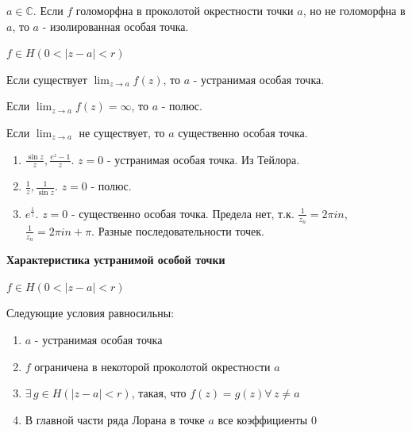 \begin{definition}
    $a \in \mathbb{C}$. Если $f$ голоморфна в проколотой окрестности
    точки $a$, но не голоморфна в $a$, то $a$ - изолированная особая точка.

    $f \in H(0 < |z - a| < r)$
\end{definition}

\begin{definition}
    Если существует $\lim_{z \to a} f(z)$, то $a$ - устранимая особая точка.

    Если $\lim_{z \to a} f(z) = \infty$, то $a$ - полюс.

    Если $\lim_{z \to a}$ не существует, то $a$ существенно особая точка.
\end{definition}

\begin{example}
    \begin{enumerate}
        \item $\frac{\sin z}{z}, \frac{e^z - 1}{z}$. $z = 0$ - устранимая особая точка. Из Тейлора.
        \item $\frac{1}{z}, \frac{1}{\sin z}$. $z = 0$ - полюс.
        \item $e^{\frac{1}{z}}$. $z = 0$ - существенно особая точка. Предела нет, т.к. $\frac{1}{z_n} = 2\pi i n$, $\frac{1}{z_n} = 2\pi i n + \pi$. Разные последовательности точек.
    \end{enumerate}
\end{example}

\begin{theorem}
    \textbf{Характеристика устранимой особой точки}

    $f \in H(0 < |z - a| < r)$

    Следующие условия равносильны:
    \begin{enumerate}
        \item $a$ - устранимая особая точка
        \item $f$ ограничена в некоторой проколотой окрестности $a$
        \item $\exists \, g \in H(|z - a| < r)$, такая, что $f(z) = g(z) \forall \, z \neq a$
        \item В главной части ряда Лорана в точке $a$ все коэффициенты $0$
    \end{enumerate}
\end{theorem}

